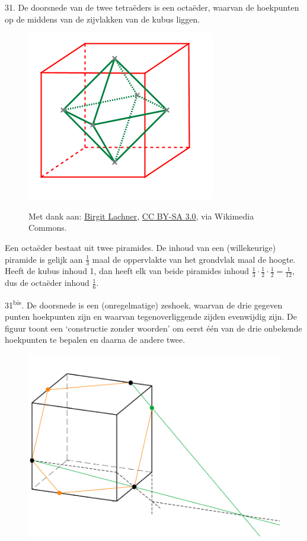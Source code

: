 \begin{problem}{31.}
    De doorsnede van de twee tetraëders is een octaëder, waarvan de hoekpunten op de middens van de zijvlakken van de kubus liggen.
    \begin{figure}
        \includegraphics[scale=0.35]{resources/Octahedron_in_Cube}

        \scriptsize{Met dank aan: \href{https://commons.wikimedia.org/wiki/File:Octahedron_in_Cube.png?uselang=nl}{Birgit Lachner}, \href{http://creativecommons.org/licenses/by-sa/3.0/}{CC BY-SA 3.0}, via Wikimedia Commons.}
    \end{figure}
    Een octaëder bestaat uit twee piramides. De inhoud van een (wil\-lekeurige) piramide is gelijk aan $\frac{1}{3}$ maal de oppervlakte van het grond\-vlak maal de hoogte. Heeft de kubus inhoud 1, dan heeft elk van beide piramides inhoud $\frac{1}{3} \cdot \frac{1}{2} \cdot \frac{1}{2} = \frac{1}{12}$, dus de octaëder inhoud $\frac{1}{6}$.
\end{problem}

\clearpage

\begin{problem}{31\textsuperscript{bis}.}
	De doorsnede is een (onregelmatige) zeshoek, waarvan de drie gegeven punten hoekpunten zijn en waarvan tegenoverliggende zijden evenwijdig zijn. De figuur toont een `constructie zonder woorden' om eerst één van de drie onbekende hoekpunten te bepalen en daarna de andere twee.
    \begin{figure}
        \includegraphics[scale=0.2]{resources/oplossing31bis}
    \end{figure}
\end{problem}

